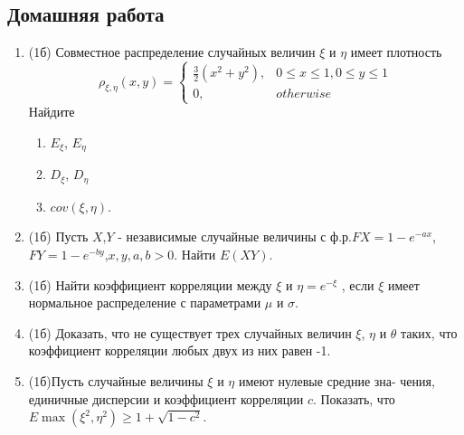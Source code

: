 \documentclass[a4paper, 14pt]{extarticle}
\begin{document}
\subsection*{Домашняя работа}
\begin{enumerate}
\item (1б) Совместное распределение случайных величин $\xi$ и $\eta$ имеет плотность
$$\rho_{\xi,\eta}(x,y) =\left\{
	\begin{array}{cc}
	\frac{3}{2}(x^2+y^2), & 0\leq x\leq 1, 0\leq y\leq 1 \\
	0, & otherwise
	\end{array}\right.$$
Найдите 
\begin{enumerate}
\item $E_{\xi}$, $E_{\eta}$
\item $D_{\xi}$, $D_{\eta}$
\item $cov(\xi,\eta)$.
\end{enumerate}
\item (1б) Пусть $X$,$Y$ - независимые случайные величины с ф.р.$FX=1-e^{-ax}$,$FY=1-e^{-by}$,$x,y,a,b>0$. Найти $E(XY)$.
\item (1б) Найти коэффициент корреляции между $\xi$ и $\eta = e^{-\xi}$ , если 
$\xi$ имеет нормальное распределение с параметрами $\mu$ и $\sigma$.
\item (1б) Доказать, что не существует трех случайных величин $\xi$, $\eta$ и
$\theta$ таких, что коэффициент корреляции любых двух из них равен -1.
\item (1б)Пусть случайные величины $\xi$ и $\eta$ имеют нулевые средние зна-
чения, единичные дисперсии
и коэффициент корреляции $c$. Показать,
что $E\max{(\xi^2,\eta^2)} \geq 1 + \sqrt{1 - c^2} $.
\end{enumerate}	
\end{document}
